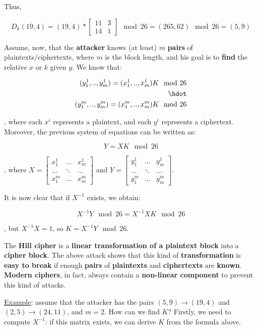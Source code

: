 Thus, 

$$
D_k(19,4) = (19,4) * \begin{bmatrix}
11 & 3 \\
14 & 1 
\end{bmatrix} \mod 26 = (265, 62) \mod 26 = (5,9)
$$

Assume, now, that the \textbf{attacker} knows (at least) $m$ \textbf{pairs} of plaintexts/ciphertexts, where $m$ is the block length, and his goal is to \textbf{find} the relative $x$ or $k$ given $y$. We know that:

\begin{align*}
    (y_1^1, .., y_m^1) = (x_1^1, .., x_m^1) K \mod 26 \\ 
    \hdot \\
(y_1^m, .., y_m^m) = (x_1^m, .., x_m^m) K \mod 26
\end{align*}

, where each $x^i$ represents a plaintext, and each $y^i$ represents a ciphertext. Moreover, the previous system of equations can be written as:

$$
Y = XK \mod 26
$$

, where $X = \begin{bmatrix}
x_1^1 & \hdots & x_m^1 \\
\hdots & \ddots & \hdots \\
x_1^m & \hdots & x_m^m
\end{bmatrix}$ and $Y = \begin{bmatrix}
y_1^1 & \hdots & y_m^1 \\
\hdots & \ddots & \hdots \\
y_1^m & \hdots & y_m^m
\end{bmatrix}$. 

It is now clear that if $X^{-1}$ exists, we obtain:

$$
X^{-1}Y \mod 26 = X^{-1} X K \mod 26
$$

, but $X^{-1}X = 1$, so $K = X^{-1}Y \mod26$.

The \textbf{Hill cipher} is a \textbf{linear transformation of a plaintext block} into a \textbf{cipher block}. The above attack shows that this kind of \textbf{transformation} is \textbf{easy to break} if enough \textbf{pairs} of \textbf{plaintexts} and \textbf{ciphertexts} are \textbf{known}. \textbf{Modern ciphers}, in fact, always contain a \textbf{non-linear component} to prevent this kind of attacks.

\underline{Example}: assume that the attacker has the pairs $(5,9) \xrightarrow{} (19,4)$ and $(2,5) \xrightarrow{}(24,11)$, and $m = 2$. How can we find $K$? Firstly, we need to compute $X^{-1}$: if this matrix exists, we can derive $K$ from the formula above.

